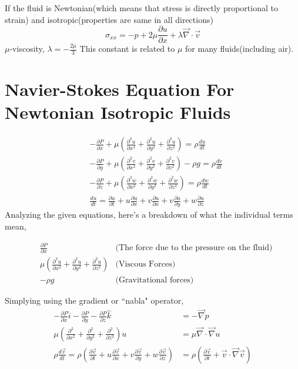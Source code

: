 \documentclass{report}
\begin{document}
If the fluid is Newtonian(which means that stress is directly proportional to strain) and isotropic(properties are same in all directions)
\[
  \sigma_{xx} = -p + 2 \mu \frac{\partial u}{\partial x} + \lambda \vec{\nabla}\cdot\vec{v}
\]
$\mu$-viscosity, $\lambda = -\frac{2\mu}{3}$ This constant is related to $\mu$ for many fluids(including air). 
\section{Navier-Stokes Equation For Newtonian Isotropic Fluids} %
\begin{align*}
  &-\frac{\partial P}{\partial x} + \mu(\frac{\partial^2 u}{\partial x^2} + \frac{\partial^2 u}{\partial y^2} + \frac{\partial^2 u}{\partial z^2}) = \rho \frac{du}{dt} \\
  &-\frac{\partial P}{\partial y} + \mu(\frac{\partial^2 v}{\partial x^2} + \frac{\partial^2 v}{\partial y^2} + \frac{\partial^2 v}{\partial z^2}) - \rho g = \rho \frac{dv}{dt} \\
  &-\frac{\partial P}{\partial z} + \mu(\frac{\partial^2 w}{\partial x^2} + \frac{\partial^2 w}{\partial y^2} + \frac{\partial^2 w}{\partial z^2}) = \rho \frac{dw}{dt} \\
  &\frac{du}{dt} = \frac{\partial u}{\partial t} + u \frac{\partial u}{\partial x} + v\frac{\partial u}{\partial x} + v \frac{\partial u}{\partial y} + w \frac{\partial u}{\partial z}
\end{align*}
Analyzing the given equations, here's a breakdown of what the individual terms mean, 

\begin{align*}
  &\frac{\partial P}{\partial x} &\text{(The force due to the pressure on the fluid)} \\
  &\mu(\frac{\partial^2 u}{\partial x^2} + \frac{\partial^2 u}{\partial y^2} + \frac{\partial^2 u}{\partial z^2}) &\text{(Viscous Forces)} \\
  &-\rho g & \text{(Gravitational forces)}
\end{align*}

Simplying using the gradient or ``nabla" operator, 
\begin{align*}
-\frac{\partial P}{\partial x} \hat{i} - \frac{\partial P}{\partial y}- \frac{\partial P}{\partial z}\hat{k} &= -\vec{\nabla} p \\ 
    \mu(\frac{\partial^2}{\partial x^2} + \frac{\partial^2}{\partial y^2} + \frac{\partial^2}{\partial z^2})u &= \mu \vec{\nabla} \cdot \vec{\nabla} u  \\
    \rho \frac{d \vec{v}}{dt} = \rho(\frac{\partial \vec{v}}{\partial t} + u \frac{\partial \vec{v}}{\partial x} + v \frac{\partial \vec{v}}{\partial y} + w \frac{\partial \vec{v}}{\partial z}) &= \rho(\frac{\partial \vec{v}}{\partial t} + \vec{v} \cdot \vec{\nabla} \vec{v})
\end{align*}
\end{document}
